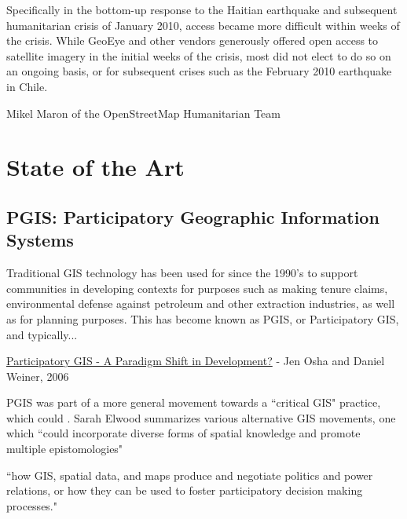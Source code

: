 \documentclass[11pt]{report}
\begin{document}
Specifically in the bottom-up response to the Haitian earthquake and subsequent humanitarian crisis of January 2010, access became more difficult within weeks of the crisis. While GeoEye and other vendors generously offered open access to satellite imagery in the initial weeks of the crisis, most did not elect to do so on an ongoing basis, or for subsequent crises such as the February 2010 earthquake in Chile.





Mikel Maron of the OpenStreetMap Humanitarian Team 


\chapter{State of the Art}
\section{PGIS: Participatory Geographic Information Systems}

Traditional GIS technology has been used for since the 1990's to support communities in developing contexts for purposes such as making tenure claims, environmental defense against petroleum and other extraction industries, as well as for planning purposes. This has become known as PGIS, or Participatory GIS, and typically... 


\href{http://www.directionsmag.com/article.php?article_id=2365&trv=1.}{Participatory GIS - A Paradigm Shift in Development?} - Jen Osha and Daniel Weiner, 2006

PGIS was part of a more general movement towards a ``critical GIS" practice, which could . Sarah Elwood summarizes various alternative GIS movements, one which ``could incorporate diverse forms of spatial knowledge and promote multiple epistomologies" \cite{elwood2009representations}

``how GIS, spatial data, and maps produce and negotiate politics and power relations, or how they can be used to foster participatory decision making processes."
\end{document}
